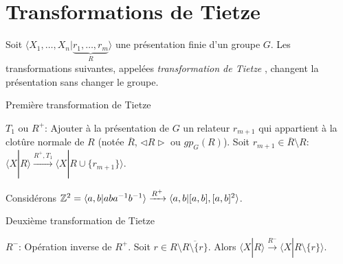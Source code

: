 
\chapter{Transformations de Tietze}
  
  \begin{defi}
  Soit $\langle X_1 , \ldots, X_n | \underbrace{r_1, \ldots, r_m}_{R}\rangle$ une présentation finie d'un
  groupe $G$. Les transformations suivantes, appelées \emph{transformation de Tietze} , changent la présentation sans changer le groupe.
  \end{defi}



   \begin{algorithm}
     \caption{Première transformation de Tietze}
     \label{alg:trans-tietze-1}
     \begin{algorithmic}
       \State $T_1$ ou $R^+$: Ajouter à la présentation de $G$ un relateur $r_{m+1}$ qui appartient à la
       clotûre normale de $R$ (notée $\overline{R}$, $\lhd R \rhd$ ou $gp_G(R)$).
       \State Soit $r_{m+1} \in \overline{R} \setminus R$: $\langle X | R \rangle \xrightarrow{R^+, T_1}
       \langle X | R \cup \{r_{m+1}\} \rangle$.
     \end{algorithmic}
   \end{algorithm}


   \begin{ex}
     Considérons $\mathbb{Z}^2 = \langle a, b | aba^{-1}b^{-1} \rangle \xrightarrow{R^+} \langle a, b | [a,b], [a,b]^2
     \rangle$.
   \end{ex}


   \begin{algorithm}
     \caption{Deuxième transformation de Tietze}
     \label{alg:trans-tietze-2}
     \begin{algorithmic}
       \State $R^-$: Opération inverse de $R^+$.
       \State Soit $r \in R \setminus \overline{R \setminus \{r\}}$. Alors $\langle X | R \rangle
       \xrightarrow{R^-} \langle X | R \setminus \{r\} \rangle$.
     \end{algorithmic}
   \end{algorithm}



